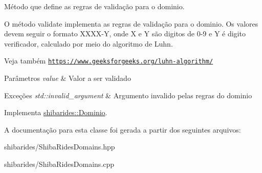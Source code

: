 Método que define as regras de validação para o dominio. 

O método validate implementa as regras de validação para o dominio. Os valores devem seguir o formato X\+X\+X\+X-\/Y, onde X e Y são digitos de 0-\/9 e Y é digito verificador, calculado por meio do algoritmo de Luhn.

\begin{DoxySeeAlso}{Veja também}
\href{https://www.geeksforgeeks.org/luhn-algorithm/}{\tt https\+://www.\+geeksforgeeks.\+org/luhn-\/algorithm/}
\end{DoxySeeAlso}

\begin{DoxyParams}{Parâmetros}
{\em value} & Valor a ser validado \\
\hline
\end{DoxyParams}

\begin{DoxyExceptions}{Exceções}
{\em std\+::invalid\+\_\+argument} & Argumento invalido pelas regras do dominio \\
\hline
\end{DoxyExceptions}


Implementa \hyperlink{classshibarides_1_1Dominio_acc9445531455c072bbf708709aebbe55}{shibarides\+::\+Dominio}.



A documentação para esta classe foi gerada a partir dos seguintes arquivos\+:\begin{DoxyCompactItemize}
\item 
shibarides/Shiba\+Rides\+Domains.\+hpp\item 
shibarides/Shiba\+Rides\+Domains.\+cpp\end{DoxyCompactItemize}
